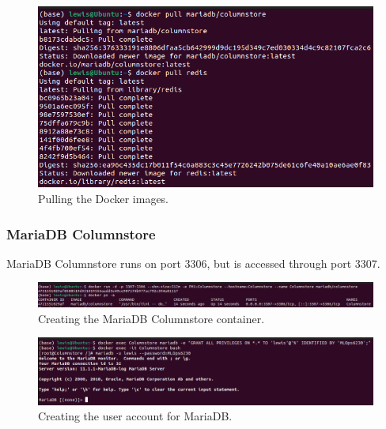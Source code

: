 \documentclass[12pt]{report}
\begin{document}
\begin{figure}[H]
    \centering
    \includegraphics[width=\linewidth]{Implementation/Docker/Containers/Pull.png}
    \caption{Pulling the Docker images.}
    \label{fig:DockerPull}
\end{figure}

\subsubsection{MariaDB Columnstore}
MariaDB Columnstore runs on port 3306, but is accessed through port 3307.

\begin{figure}[H]
    \centering
    \includegraphics[width=\linewidth]{Implementation/Docker/Containers/MariaDB/1.png}
    \caption{Creating the MariaDB Columnstore container.}
    \label{fig:CreateMCS}
\end{figure}

\begin{figure}[H]
    \centering
    \includegraphics[width=\linewidth]{Implementation/Docker/Containers/MariaDB/2.png}
    \caption{Creating the user account for MariaDB.}
    \label{fig:CreateMCSUser}
\end{figure}
\end{document}
